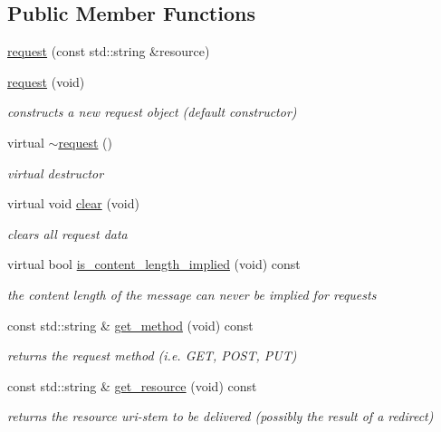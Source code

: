 \subsection*{Public Member Functions}
\begin{DoxyCompactItemize}
\item 
\hyperlink{classpion_1_1http_1_1request_a186975ae3a5cb72c0faeb0f8f66ce594}{request} (const std\-::string \&resource)
\item 
\hyperlink{classpion_1_1http_1_1request_a4cf48bf36c01ed7899b72784e01adf83}{request} (void)
\begin{DoxyCompactList}\small\item\em constructs a new request object (default constructor) \end{DoxyCompactList}\item 
virtual \hyperlink{classpion_1_1http_1_1request_a6b8d3e709899131b6d23ce623af4a7d3}{$\sim$request} ()
\begin{DoxyCompactList}\small\item\em virtual destructor \end{DoxyCompactList}\item 
virtual void \hyperlink{classpion_1_1http_1_1request_a820ac867130387a16859a6cf9ca77c74}{clear} (void)
\begin{DoxyCompactList}\small\item\em clears all request data \end{DoxyCompactList}\item 
virtual bool \hyperlink{classpion_1_1http_1_1request_a9ec7262ec35b4282ea66cf07e49fd4fb}{is\-\_\-content\-\_\-length\-\_\-implied} (void) const 
\begin{DoxyCompactList}\small\item\em the content length of the message can never be implied for requests \end{DoxyCompactList}\item 
const std\-::string \& \hyperlink{classpion_1_1http_1_1request_a43fa910a94a42fe8b26700a94ab9c3c2}{get\-\_\-method} (void) const 
\begin{DoxyCompactList}\small\item\em returns the request method (i.\-e. G\-E\-T, P\-O\-S\-T, P\-U\-T) \end{DoxyCompactList}\item 
const std\-::string \& \hyperlink{classpion_1_1http_1_1request_a929787cdfb1a8cca18c1971e3cfc5d54}{get\-\_\-resource} (void) const 
\begin{DoxyCompactList}\small\item\em returns the resource uri-\/stem to be delivered (possibly the result of a redirect) \end{DoxyCompactList}\item 

\end{DoxyCompactItemize}
